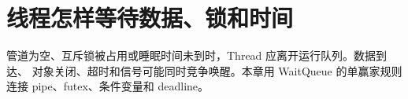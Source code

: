 \chapter{线程怎样等待数据、锁和时间}

管道为空、互斥锁被占用或睡眠时间未到时，Thread 应离开运行队列。数据到达、
对象关闭、超时和信号可能同时竞争唤醒。本章用 WaitQueue 的单赢家规则连接
pipe、futex、条件变量和 deadline。






